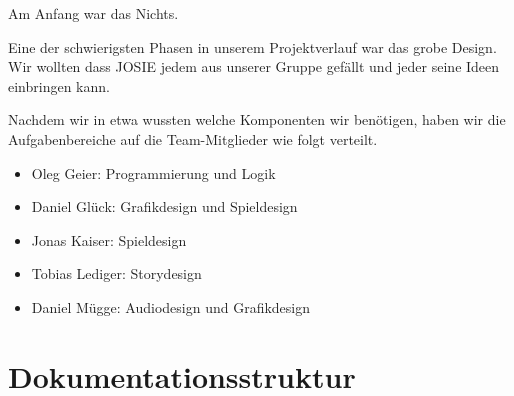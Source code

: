 Am Anfang war das Nichts.

Eine der schwierigsten Phasen in unserem Projektverlauf war das grobe Design. Wir wollten dass JOSIE jedem aus unserer Gruppe gefällt und jeder seine Ideen einbringen kann.

Nachdem wir in etwa wussten welche Komponenten wir benötigen, haben wir die Aufgabenbereiche auf die Team-Mitglieder wie folgt verteilt.

\begin{itemize}

\item Oleg Geier: Programmierung und Logik

\item Daniel Glück: Grafikdesign und Spieldesign

\item Jonas Kaiser: Spieldesign

\item Tobias Lediger: Storydesign

\item Daniel Mügge: Audiodesign und Grafikdesign

\end{itemize}



\section{Dokumentationsstruktur}\label{sec:1_Dokumentationsstruktur}

